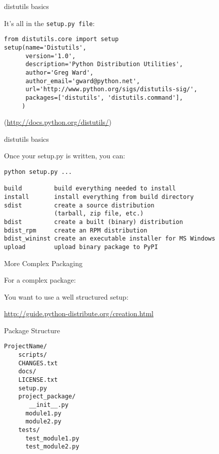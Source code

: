 \documentclass{beamer}
\begin{document}
\begin{frame}[fragile]{distutils basics}

\vfill
{\Large It's all in the \verb|setup.py file|:}

\begin{verbatim}
from distutils.core import setup
setup(name='Distutils',
      version='1.0',
      description='Python Distribution Utilities',
      author='Greg Ward',
      author_email='gward@python.net',
      url='http://www.python.org/sigs/distutils-sig/',
      packages=['distutils', 'distutils.command'],
     )
\end{verbatim}
\vfill
(\url{http://docs.python.org/distutils/})
\end{frame} 

\begin{frame}[fragile]{distutils basics}

{\Large Once your setup.py is written, you can:}

\begin{verbatim}
python setup.py ...

build         build everything needed to install
install       install everything from build directory
sdist         create a source distribution
              (tarball, zip file, etc.)
bdist         create a built (binary) distribution
bdist_rpm     create an RPM distribution
bdist_wininst create an executable installer for MS Windows
upload        upload binary package to PyPI
\end{verbatim}

\end{frame} 

\begin{frame}[fragile]{More Complex Packaging}

{\Large For a complex package:}

\vfill
{\Large You want to use a well structured setup:}

\vfill
\url{http://guide.python-distribute.org/creation.html}
\vfill
\end{frame} 

\begin{frame}[fragile]{Package Structure}

\begin{verbatim}
ProjectName/
    scripts/
    CHANGES.txt
    docs/
    LICENSE.txt
    setup.py
    project_package/
       __init__.py
      module1.py
      module2.py
    tests/
      test_module1.py
      test_module2.py
\end{verbatim}

\end{frame}
\end{document}

